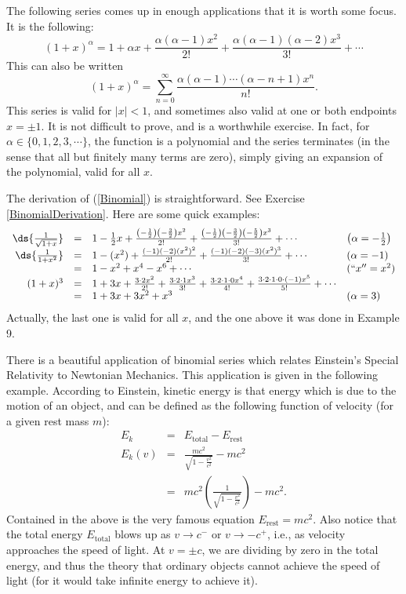 The following series comes up in enough applications that it is
worth some focus.  It is the following:
\begin{equation}
(1+x)^\alpha=1+\alpha x+\frac{\alpha(\alpha-1)x^2}{2!}
+\frac{\alpha(\alpha-1)(\alpha-2)x^3}{3!}+\cdots
\label{Binomial}\end{equation}
This can also be written
$$(1+x)^\alpha=\sum_{n=0}^\infty
	\frac{\alpha(\alpha-1)\cdots(\alpha-n+1)x^n}{n!}.$$
This series is valid for $|x|<1$, and sometimes also valid
at one or both endpoints $x=\pm1$.  It is not difficult to
prove, and is a worthwhile exercise.  In fact, for 
$\alpha\in\{0,1,2,3,\cdots\}$, the function is a polynomial and
the series terminates (in the sense that all but finitely many
terms are zero),  simply 
giving an expansion of the polynomial,  valid for all $x$. 

The derivation of (\ref{Binomial}) is straightforward.  See
Exercise \ref{BinomialDerivation}. 
Here are some quick examples:
$$\begin{array}{rcll}
\ds{\frac1{\sqrt{1+x}}}&=&1-\frac12x+\frac{\left(-\frac12\right)
\left(-\frac32\right)x^2}{2!}
+\frac{\left(-\frac12\right)\left(-\frac32\right)\left(-\frac52\right)
x^3}{3!}+\cdots\qquad & \left(\alpha=-\frac12\right)\\
\ds{\frac1{1+x^2}}&=&
1-(x^2)+\frac{(-1)(-2)(x^2)^2}{2!}+\frac{(-1)(-2)(-3)(x^2)^3}{3!}
+\cdots\vphantom{\ds{\int}}&(\alpha=-1)\\
&=&1-x^2+x^4-x^6+\cdots& (``x''=x^2)\\ 
(1+x)^3&=&1+3x+\frac{3\cdot2x^2}{2!}+\frac{3\cdot2\cdot1x^3}{3!}
+\frac{3\cdot2\cdot1\cdot0x^4}{4!}+\frac{3\cdot2\cdot1\cdot0\cdot(-1)x^5}{5!}
+\cdots\\
&=&1+3x+3x^2+x^3& \vphantom{\ds{\int}}(\alpha=3)\\
\end{array}$$ 
Actually, the last one is valid for all $x$, and the one above it 
was done in Example 9.
\bigskip

There is a beautiful application of binomial series which
relates Einstein's Special Relativity to Newtonian Mechanics.
This application is given in the following example. 
According to Einstein, kinetic energy is that energy which is
due to the motion of an object, and can  be defined as the
following function of velocity (for a given rest mass $m$): 
\begin{eqnarray*}E_k&=&E_{\mathrm{total}}-E_{\mathrm{rest}}\\
E_k(v)&=&\frac{mc^2}{\sqrt{1-\frac{v^2}{c^2}}} 
-mc^2\\
&=&mc^2\left(\frac1{\sqrt{1-\frac{v^2}{c^2}}}\right)-mc^2.
\end{eqnarray*} 
Contained in the above is the very famous equation $E_{\mathrm{rest}}
=mc^2$.
Also notice that the total energy $E_{\mathrm{total}}$ blows up
as $v\to c^-$ or $v\to-c^+$, i.e., as velocity approaches the speed
of light.  At $v=\pm c$, we are dividing by zero in the total energy,
and thus the theory that ordinary objects cannot achieve the
speed of light (for it would take infinite energy to achieve it).

